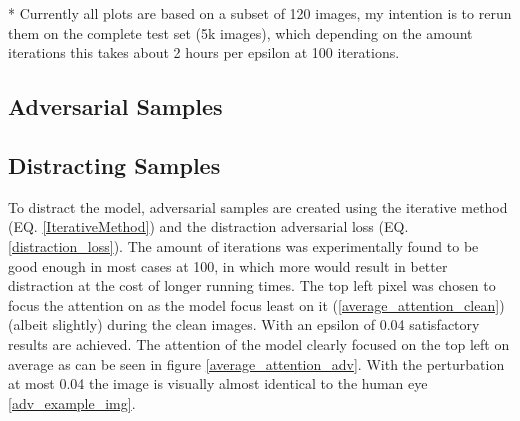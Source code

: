 * Currently all plots are based on a subset of 120 images, my intention is to rerun them on the complete test set (5k images), which depending on the amount iterations this takes about 2 hours per epsilon at 100 iterations.

\subsection*{Adversarial Samples}



\subsection*{Distracting Samples}
To distract the model, adversarial samples are created using the iterative method (EQ. \ref{IterativeMethod}) and the distraction adversarial loss (EQ. \ref{distraction_loss}). The amount of iterations was experimentally found to be good enough in most cases at 100, in which more would result in better distraction at the cost of longer running times. The top left pixel was chosen to focus the attention on as the model focus least on it (\ref{average_attention_clean}) (albeit slightly) during the clean images. With an epsilon of 0.04 satisfactory results are achieved. The attention of the model clearly focused on the top left on average as can be seen in figure \ref{average_attention_adv}. With the perturbation at most 0.04 the image is visually almost identical to the human eye \ref{adv_example_img}.

